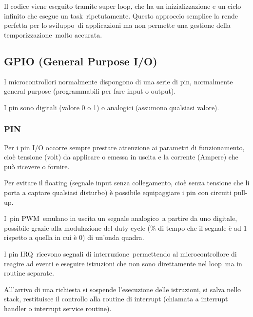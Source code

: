\documentclass[
]{article}
\begin{document}
{}

{Il codice viene eseguito tramite }{super loop}{, che ha un
inizializzazione e un ciclo infinito che esegue un
}{task}{~ripetutamente. Questo approccio semplice la rende }{perfetta
per lo sviluppo}{~di applicazioni ma }{non permette una gestione della
temporizzazione}{~molto accurata.}

{}

{}

\subsection{\texorpdfstring{{GPIO (General Purpose
I/O)}}{GPIO (General Purpose I/O)}}\label{h.fkrozkclgg15}

{I microcontrollori normalmente dispongono di una serie di pin,
normalmente general purpose (programmabili per fare input o output).}

{I pin sono digitali (valore 0 o 1) o analogici (assumono qualsiasi
valore).}

\subsubsection{\texorpdfstring{{PIN}}{PIN}}\label{h.mcmjl1lpqu1d}

{Per i pin I/O occorre sempre prestare attenzione ai parametri di
funzionamento, cioè tensione (volt) da applicare o emessa in uscita e la
corrente (Ampere) che può ricevere o fornire.}

{Per evitare il floating (segnale input senza collegamento, cioè senza
tensione che li porta a captare qualsiasi disturbo) è possibile
equipaggiare i pin con circuiti pull-up.}

{}

{I}{~}{pin PWM}{~}{emulano in uscita un segnale analogico}{~a partire da
uno digitale, possibile grazie alla modulazione del duty cycle (\% di
tempo che il segnale è ad 1 rispetto a quella in cui è 0) di un'onda
quadra.}

{}

{I }{pin IRQ}{~r}{icevono segnali di interruzione}{~permettendo al
microcontrollore di r}{eagire ad eventi e eseguire istruzioni che non
sono }{direttamente }{nel loop}{~ma in routine separate.}

{All'arrivo di una richiesta si sospende l'esecuzione delle istruzioni,
si salva nello stack, restituisce il controllo alla routine di interrupt
(chiamata a interrupt handler o interrupt service routine).}
\end{document}
